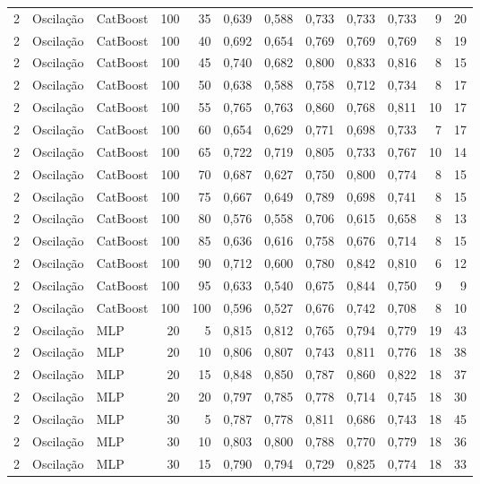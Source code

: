 \begin{longtable}{@{}rllrrrrrrrrr@{}}
2 & Oscilação & CatBoost & 100 & 35 & 0,639 & 0,588 & 0,733 & 0,733 & 0,733 & 9 & 20 \\
2 & Oscilação & CatBoost & 100 & 40 & 0,692 & 0,654 & 0,769 & 0,769 & 0,769 & 8 & 19 \\
2 & Oscilação & CatBoost & 100 & 45 & 0,740 & 0,682 & 0,800 & 0,833 & 0,816 & 8 & 15 \\
2 & Oscilação & CatBoost & 100 & 50 & 0,638 & 0,588 & 0,758 & 0,712 & 0,734 & 8 & 17 \\
2 & Oscilação & CatBoost & 100 & 55 & 0,765 & 0,763 & 0,860 & 0,768 & 0,811 & 10 & 17 \\
2 & Oscilação & CatBoost & 100 & 60 & 0,654 & 0,629 & 0,771 & 0,698 & 0,733 & 7 & 17 \\
2 & Oscilação & CatBoost & 100 & 65 & 0,722 & 0,719 & 0,805 & 0,733 & 0,767 & 10 & 14 \\
2 & Oscilação & CatBoost & 100 & 70 & 0,687 & 0,627 & 0,750 & 0,800 & 0,774 & 8 & 15 \\
2 & Oscilação & CatBoost & 100 & 75 & 0,667 & 0,649 & 0,789 & 0,698 & 0,741 & 8 & 15 \\
2 & Oscilação & CatBoost & 100 & 80 & 0,576 & 0,558 & 0,706 & 0,615 & 0,658 & 8 & 13 \\
2 & Oscilação & CatBoost & 100 & 85 & 0,636 & 0,616 & 0,758 & 0,676 & 0,714 & 8 & 15 \\
2 & Oscilação & CatBoost & 100 & 90 & 0,712 & 0,600 & 0,780 & 0,842 & 0,810 & 6 & 12 \\
2 & Oscilação & CatBoost & 100 & 95 & 0,633 & 0,540 & 0,675 & 0,844 & 0,750 & 9 & 9 \\
2 & Oscilação & CatBoost & 100 & 100 & 0,596 & 0,527 & 0,676 & 0,742 & 0,708 & 8 & 10 \\
2 & Oscilação & MLP & 20 & 5 & 0,815 & 0,812 & 0,765 & 0,794 & 0,779 & 19 & 43 \\
2 & Oscilação & MLP & 20 & 10 & 0,806 & 0,807 & 0,743 & 0,811 & 0,776 & 18 & 38 \\
2 & Oscilação & MLP & 20 & 15 & 0,848 & 0,850 & 0,787 & 0,860 & 0,822 & 18 & 37 \\
2 & Oscilação & MLP & 20 & 20 & 0,797 & 0,785 & 0,778 & 0,714 & 0,745 & 18 & 30 \\
2 & Oscilação & MLP & 30 & 5 & 0,787 & 0,778 & 0,811 & 0,686 & 0,743 & 18 & 45 \\
2 & Oscilação & MLP & 30 & 10 & 0,803 & 0,800 & 0,788 & 0,770 & 0,779 & 18 & 36 \\
2 & Oscilação & MLP & 30 & 15 & 0,790 & 0,794 & 0,729 & 0,825 & 0,774 & 18 & 33 \\

\end{longtable}
